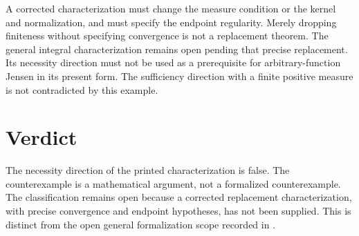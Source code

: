 \documentclass{article}
\begin{document}
A corrected characterization must change the measure condition or the
kernel and normalization, and must specify the endpoint regularity. Merely
dropping finiteness without specifying convergence is not a replacement
theorem. The general integral characterization remains open pending that
precise replacement. Its necessity direction must not be used as a
prerequisite for arbitrary-function Jensen in its present form. The
sufficiency direction with a finite positive measure is not contradicted
by this example.


\section{Verdict}
The necessity direction of the printed characterization is false. The
counterexample is a mathematical argument, not a formalized counterexample.
The classification remains open because a corrected replacement
characterization, with precise convergence and endpoint hypotheses, has not
been supplied. This is distinct from the open general formalization scope
recorded in .



\end{document}
